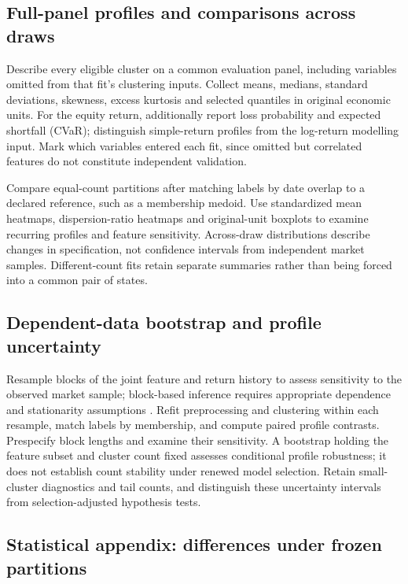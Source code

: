 \documentclass[11pt,a4paper]{article}
\begin{document}
\subsection{Full-panel profiles and comparisons across draws}

Describe every eligible cluster on a common evaluation panel, including variables omitted from that fit's clustering inputs. Collect means, medians, standard deviations, skewness, excess kurtosis and selected quantiles in original economic units. For the equity return, additionally report loss probability and expected shortfall (CVaR); distinguish simple-return profiles from the log-return modelling input. Mark which variables entered each fit, since omitted but correlated features do not constitute independent validation.

Compare equal-count partitions after matching labels by date overlap to a declared reference, such as a membership medoid. Use standardized mean heatmaps, dispersion-ratio heatmaps and original-unit boxplots to examine recurring profiles and feature sensitivity. Across-draw distributions describe changes in specification, not confidence intervals from independent market samples. Different-count fits retain separate summaries rather than being forced into a common pair of states.

\subsection{Dependent-data bootstrap and profile uncertainty}

Resample blocks of the joint feature and return history to assess sensitivity to the observed market sample; block-based inference requires appropriate dependence and stationarity assumptions \cite{politisromano1994}. Refit preprocessing and clustering within each resample, match labels by membership, and compute paired profile contrasts. Prespecify block lengths and examine their sensitivity. A bootstrap holding the feature subset and cluster count fixed assesses conditional profile robustness; it does not establish count stability under renewed model selection. Retain small-cluster diagnostics and tail counts, and distinguish these uncertainty intervals from selection-adjusted hypothesis tests.

\subsection{Statistical appendix: differences under frozen partitions}
\end{document}
